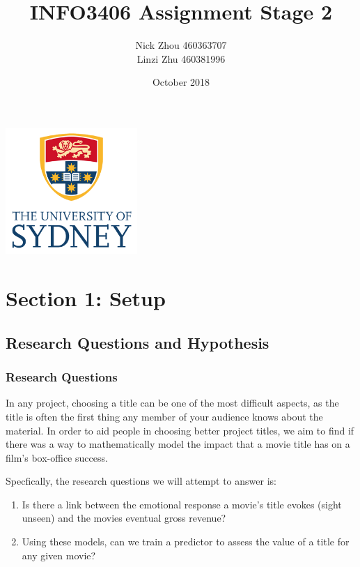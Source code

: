 \documentclass[font=10pt]{article}
\begin{document}
  \begin{titlepage}
    \centering
    \title{\textbf{INFO3406 Assignment Stage 2}}
    \author{
      Nick Zhou 460363707\\
      Linzi Zhu 460381996
    }
    \date{October 2018}
    \maketitle
    \includegraphics[width=5cm]{usyd}
  \end{titlepage}

  \begin{tableofcontents}
    \tableofcontents
    \pagebreak
  \end{tableofcontents}

  \section{Section 1: Setup}
    \subsection{Research Questions and Hypothesis}
      \subsubsection{Research Questions}

	In any project, choosing a title can be one of the most difficult aspects, as the title is often the first thing any member of your audience knows about the material. In order to aid people in choosing better project titles, we aim to find if there was a way to mathematically model the impact that a movie title has on a film's box-office success.

      Specfically, the research questions we will attempt to answer is:
      \begin{enumerate}
        \item Is there a link between the emotional response a movie’s title evokes (sight unseen) and the movies eventual gross revenue?
        \item Using these models, can we train a predictor to assess the value of a title for any given movie?
      \end{enumerate}
\end{document}
